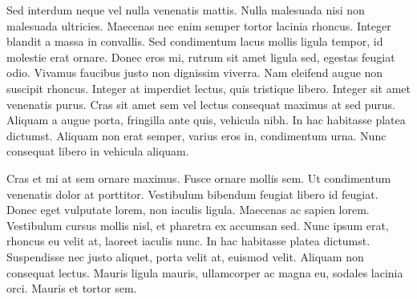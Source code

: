 Sed interdum neque vel nulla venenatis mattis. Nulla malesuada nisi non malesuada ultricies. Maecenas nec enim semper tortor lacinia rhoncus. Integer blandit a massa in convallis. Sed condimentum lacus mollis ligula tempor, id molestie erat ornare. Donec eros mi, rutrum sit amet ligula sed, egestas feugiat odio. Vivamus faucibus justo non dignissim viverra. Nam eleifend augue non suscipit rhoncus. Integer at imperdiet lectus, quis tristique libero. Integer sit amet venenatis purus. Cras sit amet sem vel lectus consequat maximus at sed purus. Aliquam a augue porta, fringilla ante quis, vehicula nibh. In hac habitasse platea dictumst. Aliquam non erat semper, varius eros in, condimentum urna. Nunc consequat libero in vehicula aliquam.

Cras et mi at sem ornare maximus. Fusce ornare mollis sem. Ut condimentum venenatis dolor at porttitor. Vestibulum bibendum feugiat libero id feugiat. Donec eget vulputate lorem, non iaculis ligula. Maecenas ac sapien lorem. Vestibulum cursus mollis nisl, et pharetra ex accumsan sed. Nunc ipsum erat, rhoncus eu velit at, laoreet iaculis nunc. In hac habitasse platea dictumst. Suspendisse nec justo aliquet, porta velit at, euismod velit. Aliquam non consequat lectus. Mauris ligula mauris, ullamcorper ac magna eu, sodales lacinia orci. Mauris et tortor sem.